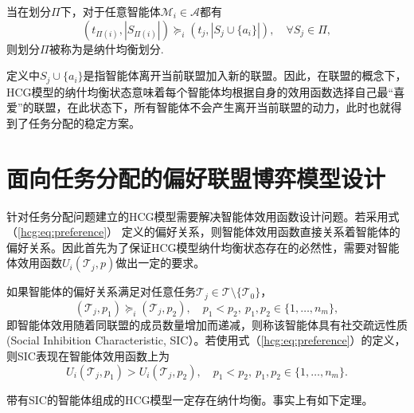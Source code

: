 \begin{definition}[HCG模型的纳什均衡]
	当在划分$\Pi$下，对于任意智能体$\mathcal{M}_i \in \mathcal{A}$都有
	\begin{equation}
	\label{hcg:eq:nash_stable}
		(t_{\Pi(i)},|S_{\Pi(i)}|) \succeq_i (t_j,|S_j \cup \{a_i\}|),\quad \forall S_j \in \Pi,
	\end{equation}
	则划分$\Pi$被称为是纳什均衡划分.
\end{definition}

定义中$S_j\cup \{a_i\}$是指智能体离开当前联盟加入新的联盟。因此，在联盟的概念下，HCG模型的纳什均衡状态意味着每个智能体均根据自身的效用函数选择自己最“喜爱”的联盟，在此状态下，所有智能体不会产生离开当前联盟的动力，此时也就得到了任务分配的稳定方案。



\section{面向任务分配的偏好联盟博弈模型设计}
\label{hcg:HGTA}


针对任务分配问题建立的HCG模型需要解决智能体效用函数设计问题。若采用式（\ref{hcg:eq:preference}） 定义的偏好关系，则智能体效用函数直接关系着智能体的偏好关系。因此首先为了保证HCG模型纳什均衡状态存在的必然性，需要对智能体效用函数$U_i(\mathcal{T}_j,p)$做出一定的要求。

\begin{definition}[社交疏远性质]
\label{hcg:eq:spao}
	如果智能体的偏好关系满足对任意任务$\mathcal{T}_j \in \mathcal{T} \setminus \{\mathcal{T}_0\}$，
	\begin{equation}
	\label{hcg:eq:spaoPrefer}
		(\mathcal{T}_j,p_1) \succeq_i (\mathcal{T}_j,p_2),\quad p_1 < p_2,\ p_1,p_2 \in \{1,\dots,n_m\},
	\end{equation}
	即智能体效用随着同联盟的成员数量增加而递减，则称该智能体具有社交疏远性质(Social Inhibition Characteristic, SIC）。若使用式（\ref{hcg:eq:preference}）的定义，则SIC表现在智能体效用函数上为
	\begin{equation}
	\label{hcg:eq:spaoU}
		U_i(\mathcal{T}_j,p_1) > U_i(\mathcal{T}_j,p_2),\quad p_1<p_2,\ p_1,p_2 \in \{1,\dots,n_m\}.
	\end{equation}
\end{definition}

带有SIC的智能体组成的HCG模型一定存在纳什均衡。事实上有如下定理。

